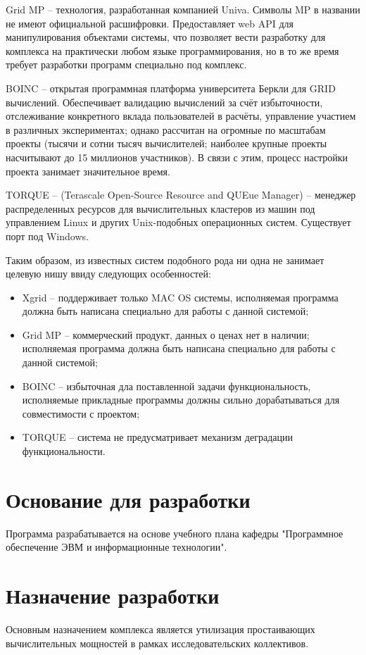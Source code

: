 \documentclass[a4paper,12pt]{report}
\numberwithin{equation}{section}
\begin{document}
Grid MP -- технология, разработанная компанией Univa. Символы MP в названии не имеют официальной расшифровки. 
Предоставляет web API для манипулирования объектами системы, что позволяет вести разработку для комплекса на практически любом языке программирования, но в то же время требует разработки программ специально под комплекс.

BOINC -- открытая программная платформа университета Беркли для GRID вычислений. 
Обеспечивает валидацию вычислений за счёт избыточности, отслеживание конкретного вклада пользователей в расчёты, управление участием в различных экспериментах; однако рассчитан на огромные по масштабам проекты (тысячи и сотни тысяч вычислителей; наиболее крупные проекты насчитывают до 15 миллионов участников). 
В связи с этим, процесс настройки проекта занимает значительное время.

TORQUE -- (Terascale Open-Source Resource and QUEue Manager) -- менеджер распределенных ресурсов для вычислительных кластеров из машин под управлением Linux и других Unix-подобных операционных систем. Существует порт под Windows.

Таким образом, из известных систем подобного рода ни одна не занимает целевую нишу ввиду следующих особенностей: 
\begin{itemize}
  \item Xgrid -- поддерживает только MAC OS системы, исполняемая программа должна быть написана специально для работы с данной системой;
  \item Grid MP -- коммерческий продукт, данных о ценах нет в наличии; исполняемая программа должна быть написана специально для работы с данной системой;
  \item BOINC -- избыточная дла поставленной задачи функциональность, исполняемые прикладные программы должны сильно дорабатываться для совместимости с проектом;
  \item TORQUE -- система не предусматривает механизм деградации функциональности.
\end{itemize}

\section{Основание для разработки}
Программа разрабатывается на основе учебного плана кафедры "Программное обеспечение ЭВМ и информационные технологии".

\section{Назначение разработки}
Основным назначением комплекса является утилизация простаивающих вычислительных мощностей в рамках исследовательских коллективов.
\end{document}
